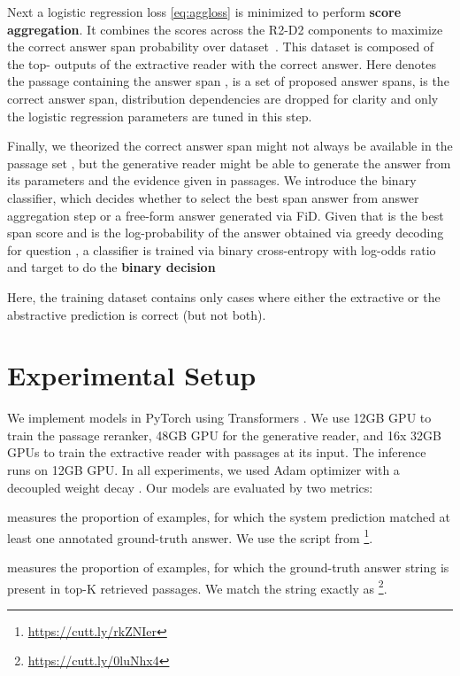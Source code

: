 \documentclass[11pt,a4paper]{article}
\begin{document}
Next a logistic regression loss \eqref{eq:aggloss} is minimized to perform \textbf{score aggregation}. It combines the scores across the R2-D2 components to maximize the correct answer span probability over dataset~. This dataset is composed of the top- outputs of the extractive reader with the correct answer.
Here  denotes the passage containing the answer span ,  is a set of proposed answer spans,  is the correct answer span, distribution dependencies are dropped for clarity and only the logistic regression parameters  are tuned in this step.

Finally, we theorized the correct answer span might not always be available in the passage set , but the generative reader might be able to generate the answer from its parameters and the evidence given in passages. We introduce the binary classifier, which decides whether to select the best span answer from answer aggregation step or a free-form answer generated via FiD. Given that  is the best span score and  is the log-probability of the answer   obtained via greedy decoding for question , a classifier is trained via binary cross-entropy  with log-odds ratio  and target  to do the \textbf{binary decision}

Here, the training dataset  contains only cases where either the extractive or the abstractive prediction is correct (but not both).
\section{Experimental Setup}
We implement models in PyTorch \cite{paszke2019pytorch} using Transformers \cite{wolf-etal-2020-transformers}. We use 12GB GPU to train the passage reranker, 48GB GPU for the generative reader, and 16x 32GB GPUs to train the extractive reader with  passages at its input. The inference runs on 12GB GPU. In all experiments, we used Adam optimizer with a decoupled weight decay \cite{loshchilov2017decoupled}. Our models are evaluated by two metrics:
\begin{description}[style=unboxed,leftmargin=0em,listparindent=\parindent]    \setlength\parskip{0em}
    \item [Exact match (EM)] measures the proportion of examples, for which the system prediction matched at least one annotated ground-truth answer. We use the script from \citet{lee-etal-2019-latent}\footnote{\url{https://cutt.ly/rkZNIer}}.
    \item [Accuracy@K] measures the proportion of examples, for which the ground-truth answer string is present in top-K retrieved passages. We match the string exactly as \citet{karpukhin2020dense}\footnote{\url{https://cutt.ly/0luNhx4}}.
\end{description}
\end{document}
